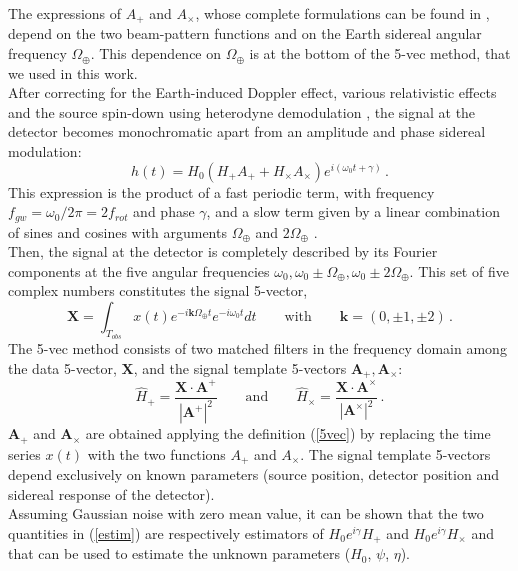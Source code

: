 \documentclass[11pt,a4paper,final]{iopart}
\begin{document}
The expressions of $A_+$ and $A_\times$, whose complete formulations can be found in \cite{2010}, depend on the  two  beam-pattern  functions and on the Earth sidereal angular frequency $\Omega_\oplus$. This dependence on $\Omega_\oplus$ is at the bottom of the 5-vec method, that we used in this work. 
\\After correcting for the Earth-induced Doppler effect, various relativistic effects and the source spin-down using heterodyne demodulation \cite{2019}, the signal at the detector becomes monochromatic apart from an amplitude and phase sidereal modulation:\begin{equation}
h(t)=H_0(H_+ A_+ + H_\times A_\times)e^{i(\omega_0 t + \gamma)}\,.
\end{equation}This expression is the product of a fast periodic term, with frequency $f_{gw}=\omega_0/2\pi=2f_{rot}$ and phase $\gamma$, and a slow term given by a linear combination of sines and cosines with arguments $\Omega_\oplus$ and $2\Omega_\oplus$ \cite{2010}.\\  Then, the signal at the detector is completely described by its Fourier components at the five angular frequencies $\omega_0, \omega_0\pm\Omega_\oplus ,\omega_0\pm2\Omega_\oplus$.
This set of five complex numbers constitutes the signal 5-vector,
\begin{equation}\label{5vec}
 \textbf{X} =\int_{T_{obs}}x(t) e^{-i\textbf{k} \Omega_\oplus t} e^{-i\omega_0t}dt \qquad \text{with} \qquad \textbf{k}=(0,\pm 1,\pm 2)\,.
\end{equation}
The 5-vec method consists of two matched filters in the frequency domain among the data 5-vector, $\textbf{X}$, and the signal template 5-vectors $\textbf{A}_+, \textbf{A}_\times$: \begin{equation}\label{estim}
\hat{H}_+=\frac{\textbf{X}\cdot \textbf{A}^+}{|\textbf{A}^+|^2} \qquad \text{and} \qquad \hat{H}_\times=\frac{\textbf{X}\cdot \textbf{A}^\times}{|\textbf{A}^\times|^2}\,.
\end{equation} $\textbf{A}_+$ and  $\textbf{A}_\times$ are obtained applying the definition (\ref{5vec}) by replacing the time series $x(t)$ with the two functions $A_+$ and $A_\times$. The signal template 5-vectors depend exclusively on known parameters (source position, detector position and sidereal response of the detector).
\\Assuming Gaussian noise with zero mean value, it can be shown \cite{2010} that the two quantities in (\ref{estim}) are respectively estimators of $H_0e^{i\gamma}H_+$ and $H_0e^{i\gamma}H_\times$ and that can be used to estimate the unknown parameters ($H_0$, $\psi$, $\eta$).
\end{document}
